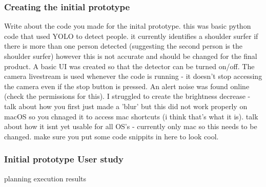 \documentclass[12pt]{article}
\theoremstyle{plain}
\theoremstyle{definition}
\begin{document}
\subsubsection{Creating the initial prototype}
Write about the code you made for the inital prototype. this was basic python code that used YOLO to detect people. it currently identifies a shoulder surfer if there is more than one person detected (suggesting the second person is the shoulder surfer) however this is not accurate and should be changed for the final product. A basic UI was created so that the detector can be turned on/off. The camera livestream is used whenever the code is running - it doesn't stop accessing the camera even if the stop button is pressed. An alert noise was found online (check the permissions for this). I struggled to create the brightness decrease - talk about how you first just made a 'blur' but this did not work properly on macOS so you chnaged it to access mac shortcuts (i think that's what it is). talk about how it isnt yet usable for all OS's - currently only mac so this needs to be changed. make sure you put some code snippits in here to look cool.

\subsubsection{Initial prototype User study}
planning
execution
results

\printbibliography

\clearpage\appendix
\end{document}
